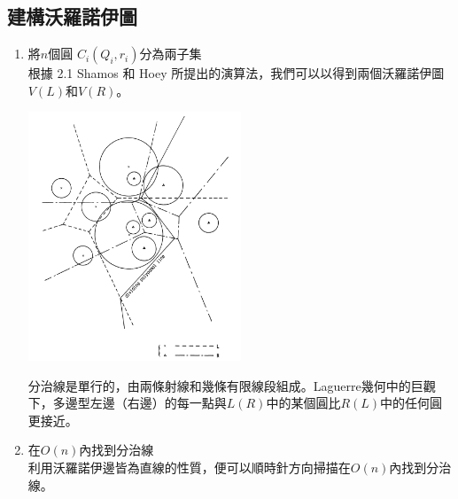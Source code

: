 \documentclass[15pt]{extarticle}
\begin{document}
\subsection{建構沃羅諾伊圖}
\begin{enumerate}
    \item 將$n$個圓 $C_i(Q_i,r_i)$分為兩子集 \\
        根據 2.1 Shamos 和 Hoey 所提出的演算法，我們可以以得到兩個沃羅諾伊圖$V(L)$和$V(R)$。
        \begin{center}
            \includegraphics[width=0.5\textwidth]{fig4.png}
        \end{center}
    \begin{lemma}
        分治線是單行的，由兩條射線和幾條有限線段組成。Laguerre幾何中的巨觀下，多邊型左邊（右邊）的每一點與$L(R)$中的某個圓比$R(L)$中的任何圓更接近。
    \end{lemma}

    \item 在$O(n)$內找到分治線 \\
    利用沃羅諾伊邊皆為直線的性質，便可以順時針方向掃描在$O(n)$內找到分治線。


\end{enumerate}
\end{document}
